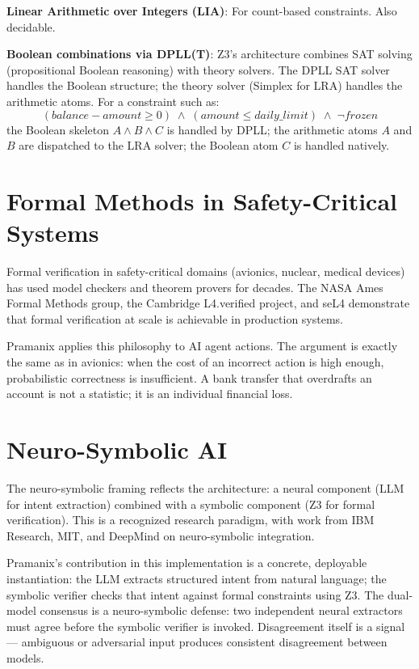 \documentclass[12pt,a4paper,oneside]{report}
\begin{document}
\textbf{Linear Arithmetic over Integers (LIA)}: For count-based constraints.
Also decidable.

\textbf{Boolean combinations via DPLL(T)}: Z3's architecture combines SAT
solving (propositional Boolean reasoning) with theory solvers. The DPLL SAT
solver handles the Boolean structure; the theory solver (Simplex for LRA)
handles the arithmetic atoms. For a constraint such as:
\begin{equation}
  (balance - amount \geq 0) \;\wedge\; (amount \leq daily\_limit) \;\wedge\;
  \neg frozen
  \label{eq:banking-policy}
\end{equation}
the Boolean skeleton $A \wedge B \wedge C$ is handled by DPLL; the arithmetic
atoms $A$ and $B$ are dispatched to the LRA solver; the Boolean atom $C$ is
handled natively.

\section{Formal Methods in Safety-Critical Systems}

Formal verification in safety-critical domains (avionics, nuclear, medical
devices) has used model checkers and theorem provers for decades. The NASA
Ames Formal Methods group, the Cambridge L4.verified project, and seL4
demonstrate that formal verification at scale is achievable in production
systems.

Pramanix applies this philosophy to AI agent actions. The argument is exactly
the same as in avionics: when the cost of an incorrect action is high enough,
probabilistic correctness is insufficient. A bank transfer that overdrafts an
account is not a statistic; it is an individual financial loss.

\section{Neuro-Symbolic AI}

The neuro-symbolic framing reflects the architecture: a neural component (LLM
for intent extraction) combined with a symbolic component (Z3 for formal
verification). This is a recognized research paradigm, with work from IBM
Research, MIT, and DeepMind on neuro-symbolic integration.

Pramanix's contribution in this implementation is a concrete, deployable
instantiation: the LLM extracts structured intent from natural language; the
symbolic verifier checks that intent against formal constraints using Z3. The dual-model consensus is a
neuro-symbolic defense: two independent neural extractors must agree before
the symbolic verifier is invoked. Disagreement itself is a signal --- ambiguous
or adversarial input produces consistent disagreement between models.
\end{document}
